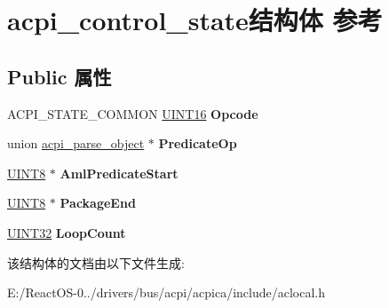 \hypertarget{structacpi__control__state}{}\section{acpi\+\_\+control\+\_\+state结构体 参考}
\label{structacpi__control__state}
\subsection*{Public 属性}
\begin{DoxyCompactItemize}
\item 
\mbox{\label{structacpi__control__state_aec317e4d488a01cd8838d7aa0c015773}} 
A\+C\+P\+I\+\_\+\+S\+T\+A\+T\+E\+\_\+\+C\+O\+M\+M\+ON \hyperlink{_processor_bind_8h_a09f1a1fb2293e33483cc8d44aefb1eb1}{U\+I\+N\+T16} {\bfseries Opcode}
\item 
\mbox{\label{structacpi__control__state_ac6a1ae695403b7e7a1a8a2e65eced819}} 
union \hyperlink{unionacpi__parse__object}{acpi\+\_\+parse\+\_\+object} $\ast$ {\bfseries Predicate\+Op}
\item 
\mbox{\label{structacpi__control__state_a9583b2a481b110b5a8fac4dce6a999a1}} 
\hyperlink{_processor_bind_8h_ab27e9918b538ce9d8ca692479b375b6a}{U\+I\+N\+T8} $\ast$ {\bfseries Aml\+Predicate\+Start}
\item 
\mbox{\label{structacpi__control__state_aa899969731fd4687f5466b07535903db}} 
\hyperlink{_processor_bind_8h_ab27e9918b538ce9d8ca692479b375b6a}{U\+I\+N\+T8} $\ast$ {\bfseries Package\+End}
\item 
\mbox{\label{structacpi__control__state_ad65aea6b7164466af873b55f911ef84e}} 
\hyperlink{_processor_bind_8h_ae1e6edbbc26d6fbc71a90190d0266018}{U\+I\+N\+T32} {\bfseries Loop\+Count}
\end{DoxyCompactItemize}


该结构体的文档由以下文件生成\+:\begin{DoxyCompactItemize}
\item 
E\+:/\+React\+O\+S-\/0../drivers/bus/acpi/acpica/include/aclocal.\+h\end{DoxyCompactItemize}
